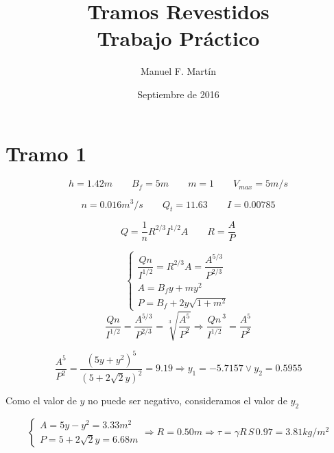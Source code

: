 \documentclass[10.5pt]{article}
\begin{document}
\date{Septiembre de 2016}
\title{Tramos Revestidos\\Trabajo Práctico}
\author{Manuel F. Martín}

\maketitle


\section*{Tramo 1}


\begin{equation*}
  h = 1.42 m
 \qquad
  B_{f} = 5 m
 \qquad
  m = 1
 \qquad
  V_{max} = 5 m/s
\end{equation*}

\begin{equation*}
  n = 0.016 m^3/s
 \qquad
  Q_{t} = 11.63
 \qquad
  I = 0.00785
\end{equation*}

\begin{equation*}
 Q = \frac{1}{n} R^{2/3} I^{1/2} A
 \qquad
 R = \frac{A}{P}
\end{equation*}

\begin{equation*}
  \begin{cases}
    \dfrac{Q n}{I^{1/2}} = R^{2/3} A = \dfrac{A^{5/3}}{P^{2/3}} \\
    A = B_{f}y + m y^{2} \\
    P = B_{f} + 2 y \sqrt{1 + m^{2}}
  \end{cases}
\end{equation*}
\begin{equation*}
  \dfrac{Q n}{I^{1/2}} = \dfrac{A^{5/3}}{P^{2/3}} = \sqrt[3]{\dfrac{A^{5}}{P^{2}}}
  \Rightarrow
  \dfrac{Q n}{I^{1/2}}^{3} = \dfrac{A^{5}}{P^{2}}
\end{equation*}

\begin{equation*}
  \dfrac{A^{5}}{P^{2}} = \dfrac{(5 y + y^{2})^{5}}{(5 + 2 \sqrt{2} y)^{2}} = 9.19
  \Rightarrow
  y_{1} = -5.7157 \vee y_{2} = 0.5955
\end{equation*}


Como el valor de $y$ no puede ser negativo, consideramos el valor de $y_{2}$

\begin{equation*}
  \begin{cases}
    A = 5 y - y^{2} = 3.33 m^{2} \\
    P = 5 + 2 \sqrt{2} y = 6.68 m
  \end{cases}
  \Rightarrow
  R = 0.50 m
  \Rightarrow
  \tau = \gamma R \, S \, 0.97 = 3.81 kg/m^{2}
\end{equation*}
\end{document}
